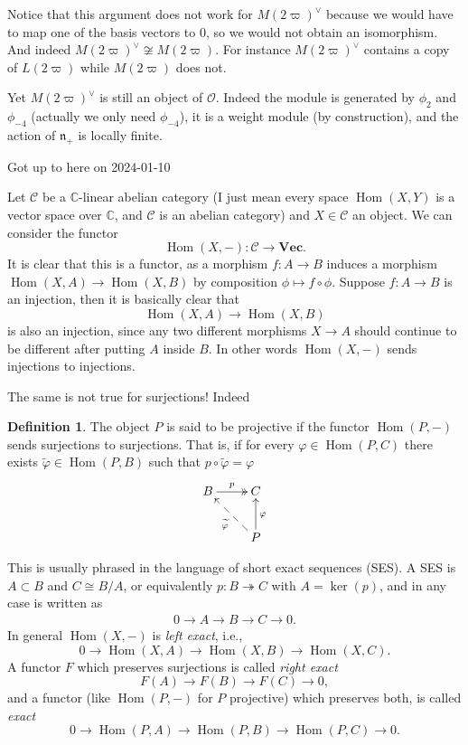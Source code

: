 \documentclass[12pt]{article}
\theoremstyle{plain}
\theoremstyle{definition}
\newtheorem{defn}{Definition}[section]
\numberwithin{equation}{section}
\DeclareMathOperator{\Hom}{Hom}
\newcommand{\wtil}[1]{\widetilde{#1}}
\newcommand{\C}{\mathbb{C}}
\newcommand{\n}{\mathfrak{n}}
\newcommand{\CC}{\mathcal{C}}
\newcommand{\OO}{\mathcal{O}}
\newcommand{\Vect}{\mathbf{Vec}}
\begin{document}
Notice that this argument does not work for $M(2\varpi)^\vee$ because we would have to map one of the basis vectors to $0$, so we would not obtain an isomorphism. And indeed $M(2\varpi)^\vee \not\cong M(2\varpi)$. For instance $M(2\varpi)^\vee$ contains a copy of $L(2\varpi)$ while $M(2\varpi)$ does not.

Yet $M(2\varpi)^\vee$ is still an object of $\OO$. Indeed the module is generated by $\phi_2$ and $\phi_{-4}$ (actually we only need $\phi_{-4}$), it is a weight module (by construction), and the action of $\n_+$ is locally finite.


{\color{red}Got up to here on 2024-01-10}

Let $\CC$ be a $\C$-linear abelian category (I just mean every space $\Hom(X, Y)$ is a vector space over $\C$, and $\CC$ is an abelian category) and $X \in \CC$ an object. We can consider the functor
\[
\Hom(X, -) : \CC \rightarrow \Vect.
\]
It is clear that this is a functor, as a morphism $f : A \rightarrow B$ induces a morphism $\Hom(X, A) \rightarrow \Hom(X, B)$ by composition $\phi \mapsto f \circ \phi$. Suppose $f : A \rightarrow B$ is an injection, then it is basically clear that
\[
\Hom(X, A) \rightarrow \Hom(X, B)
\]
is also an injection, since any two different morphisms $X \rightarrow A$ should continue to be different after putting $A$ inside $B$. In other words $\Hom(X, -)$ sends injections to injections.

The same is not true for surjections! Indeed
\begin{defn}
The object $P$ is said to be projective if the functor $\Hom(P, -)$ sends surjections to surjections. That is, if for every $\varphi \in \Hom(P, C)$ there exists $\wtil\varphi \in \Hom(P, B)$ such that $p \circ \wtil{\varphi} = \varphi$
\begin{align*}
\xymatrix{
B \ar@{->>}[r]^{p} & C \\
%
 & P \ar@{->}[u]_{\varphi} \ar@{-->}[ul]^{\wtil{\varphi}} \\
}
\end{align*}
\end{defn}
This is usually phrased in the language of short exact sequences (SES). A SES is $A \subset B$ and $C \cong B/A$, or equivalently $p : B \twoheadrightarrow C$ with $A = \ker(p)$, and in any case is written as
\begin{align}\label{eq:SES}
0 \rightarrow A \rightarrow B \rightarrow C \rightarrow 0.
\end{align}
In general $\Hom(X, -)$ is \emph{left exact}, i.e.,
\[
0 \rightarrow \Hom(X, A) \rightarrow \Hom(X, B) \rightarrow \Hom(X, C).
\]
A functor $F$ which preserves surjections is called \emph{right exact}
\[
F(A) \rightarrow F(B) \rightarrow F(C) \rightarrow 0,
\]
and a functor (like $\Hom(P, -)$ for $P$ projective) which preserves both, is called \emph{exact}
\[
0 \rightarrow \Hom(P, A) \rightarrow \Hom(P, B) \rightarrow \Hom(P, C) \rightarrow 0.
\]
\end{document}
